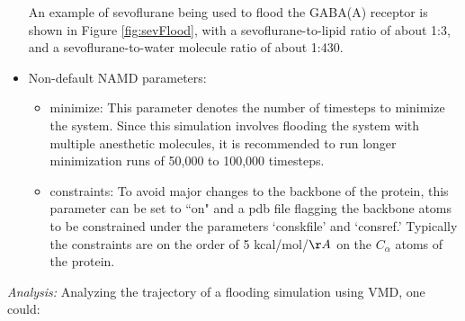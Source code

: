 \documentclass[12pt]{article}
\begin{document}
\begin{itemize}
An example of sevoflurane being used to flood the GABA(A) receptor is shown in Figure \ref{fig:sevFlood}, with a sevoflurane-to-lipid ratio of about 1:3, and a sevoflurane-to-water molecule ratio of about 1:430.
  \item Non-default NAMD parameters: 
  	\begin{itemize}
 	 \item minimize: This parameter denotes the number of timesteps to minimize the system. Since this simulation involves flooding the system with multiple anesthetic molecules, it is recommended to run longer minimization runs of 50,000 to 100,000 timesteps.
	 \item constraints: To avoid major changes to the backbone of the protein, this parameter can be set to ``on" and a pdb file flagging the backbone atoms to be constrained under the parameters `conskfile' and `consref.' Typically the constraints are on the order of 5 kcal/mol/$\AA$ on the $C_{\alpha}$ atoms of the protein.
	 \end{itemize}
\end{itemize} \hfill \break
\textit {Analysis:}
	Analyzing the trajectory of a flooding simulation using VMD, one could:
\end{document}
